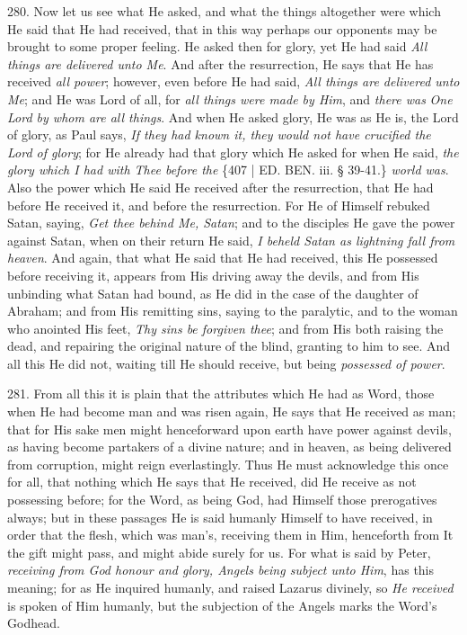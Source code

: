 280. Now let us see
what He asked, and what the things altogether were which He said that
He had received, that in this way perhaps our opponents may be brought
to some proper feeling. He asked then for glory, yet He had said \emph{All
things are delivered unto Me}. And after the resurrection, He says
that He has received \emph{all power}; however, even before He had
said, \emph{All things are delivered unto Me}; and He was Lord of all,
for \emph{all things were made by Him}, and \emph{there was} \emph{One
Lord by whom are all things}. And when He asked glory, He was as He
is, the Lord of glory, as Paul says, \emph{If they had known it, they
would not have crucified the Lord of glory}; for He already had
that glory which He asked for when He said, \emph{the glory which I had
with Thee before the} \{407 | ED.
BEN. iii. § 39-41.\} \emph{world was}. Also the
power which He said He received after the resurrection, that He had
before He received it, and before the resurrection. For He of Himself
rebuked Satan, saying, \emph{Get thee behind Me, Satan}; and to the
disciples He gave the power against Satan, when on their return He
said, \emph{I beheld Satan as lightning fall from heaven}. And again,
that what He said that He had received, this He possessed before
receiving it, appears from His driving away the devils, and from His
unbinding what Satan had bound, as He did in the case of the daughter
of Abraham; and from His remitting sins, saying to the paralytic, and
to the woman who anointed His feet, \emph{Thy sins be forgiven thee};
and from His both raising the dead, and repairing the original nature
of the blind, granting to him to see. And all this He did not, waiting
till He should receive, but being \emph{possessed of power}.

281.
From all this it is plain that the attributes which He had as Word,
those when He had become man and was risen again, He says that He
received as man; that for His sake men might henceforward upon earth
have power against devils, as having become partakers of a divine
nature; and in heaven, as being delivered from corruption, might reign
everlastingly. Thus He must acknowledge this once for all, that
nothing which He says that He received, did He receive as not
possessing before; for the Word, as being God, had Himself those
prerogatives always; but in these passages He is said humanly Himself
to have received, in order that the flesh, which was man's, receiving
them in Him, henceforth from It the gift might pass, and might abide
surely for us. For what is said by Peter, \emph{receiving from God honour
and glory, Angels being subject unto Him}, has this meaning; for as
He inquired humanly, and raised Lazarus divinely, so \emph{He received}
is spoken of Him humanly, but the subjection of the Angels marks the
Word's Godhead.

